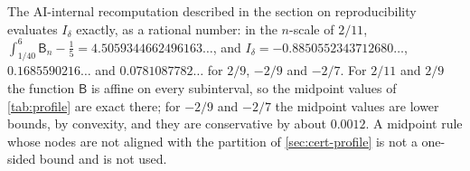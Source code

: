 \begin{remark}\label{rem:profile-float}
The AI-internal recomputation described in the section on reproducibility evaluates $I_\delta$ exactly, as a rational number: in the $n$-scale of $2/11$, $\int_{1/40}^6\mathsf B_n-\frac15=4.5059344662496163\ldots$, and $I_\delta=-0.8850552343712680\ldots$, $0.1685590216\ldots$ and $0.0781087782\ldots$ for $2/9$, $-2/9$ and $-2/7$. For $2/11$ and $2/9$ the function $\mathsf B$ is affine on every subinterval, so the midpoint values of \cref{tab:profile} are exact there; for $-2/9$ and $-2/7$ the midpoint values are lower bounds, by convexity, and they are conservative by about $0.0012$. A midpoint rule whose nodes are not aligned with the partition of \cref{sec:cert-profile} is not a one-sided bound and is not used.
\end{remark}
